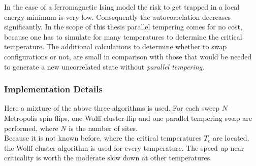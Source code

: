         In the case of a ferromagnetic Ising model the risk to get trapped
        in a local energy minimum is very low. Consequently the autocorrelation
        decreases significantly. In the scope of this thesis parallel tempering comes
        for no cost, because one has to simulate for many temperatures
        to determine the critical temperature. The additional calculations
        to determine whether to swap configurations or not, are small in
        comparison with those that would be needed to generate a new
        uncorrelated state without \emph{parallel tempering}.

    \subsubsection{Implementation Details}
        Here a mixture of the above three algorithms is used.
        For each sweep \(N\) Metropolis spin flips, one Wolff cluster flip
        and one parallel tempering swap are performed, where \(N\) is the
        number of sites.\\
        Because it is not known before, where the critical temperatures
        \(T_c\) are located, the Wolff cluster algorithm is used for
        every temperature. The speed up near criticality is worth the
        moderate slow down at other temperatures.

